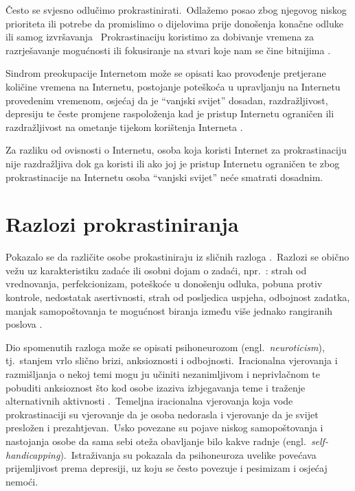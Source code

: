 \documentclass[11pt,twocolumn,english]{article}
\newcommand{\engl}[1]{(engl.~\emph{#1})}
\begin{document}
Često se svjesno odlučimo prokrastinirati.~Odlažemo posao zbog njegovog niskog
prioriteta ili potrebe da promislimo o dijelovima prije donošenja konačne odluke
ili samog izvršavanja~ Prokrastinaciju koristimo za dobivanje vremena za
razrješavanje mogućnosti ili fokusiranje na stvari koje nam se čine bitnijima
\cite{burka2004procrastination}.

Sindrom preokupacije Internetom može se opisati kao provođenje pretjerane
količine vremena na Internetu, postojanje poteškoća u upravljanju na Internetu provedenim
vremenom, osjećaj da je ``vanjski svijet'' dosadan, razdražljivost, depresiju
te česte promjene raspoloženja kad je pristup Internetu ograničen ili
razdražljivost na ometanje tijekom korištenja Interneta
\cite{yellowlees2007problematic}.
 
Za razliku od ovisnosti o Internetu, osoba koja koristi Internet za
prokrastinaciju nije razdražljiva dok ga koristi ili ako joj je pristup
Internetu ograničen te zbog prokrastinacije na Internetu osoba ``vanjski
svijet'' neće smatrati dosadnim.


\section{Razlozi prokrastiniranja}
Pokazalo se da različite osobe prokastiniraju iz sličnih razloga
\cite{steel2007nature}.~Razlozi se obično vežu uz karakteristiku zadaće ili
osobni dojam o zadaći, npr.~\cite{solomon1984academic}: strah od vrednovanja,
perfekcionizam, poteškoće u donošenju odluka, pobuna protiv kontrole,
nedostatak asertivnosti, strah od posljedica uspjeha, odbojnost zadatka,
manjak samopoštovanja te mogućnost biranja između više jednako rangiranih
poslova \cite{o2001choice}.

Dio spomenutih razloga može se opisati psihoneurozom \engl{neuroticism},
tj.~stanjem vrlo slično brizi, anksioznosti i odbojnosti.~Iracionalna vjerovanja
i razmišljanja o nekoj temi mogu ju učiniti nezanimljivom i neprivlačnom te
pobuditi anksioznost što kod osobe izaziva izbjegavanja teme i traženje
alternativnih aktivnosti \cite{steel2007nature}.~Temeljna iracionalna vjerovanja koja vode
prokrastinaciji su vjerovanje da je osoba nedorasla i vjerovanje da je svijet
presložen i prezahtjevan.~Usko povezane su pojave niskog samopoštovanja i
nastojanja osobe da sama sebi oteža obavljanje bilo kakve radnje
\engl{self-handicapping}.~Istraživanja \cite{Caballero95neuro, Saklofske95neuro}
su pokazala da psihoneuroza uvelike povećava prijemljivost prema depresiji, uz
koju se često povezuje i pesimizam i osjećaj nemoći.
\end{document}
